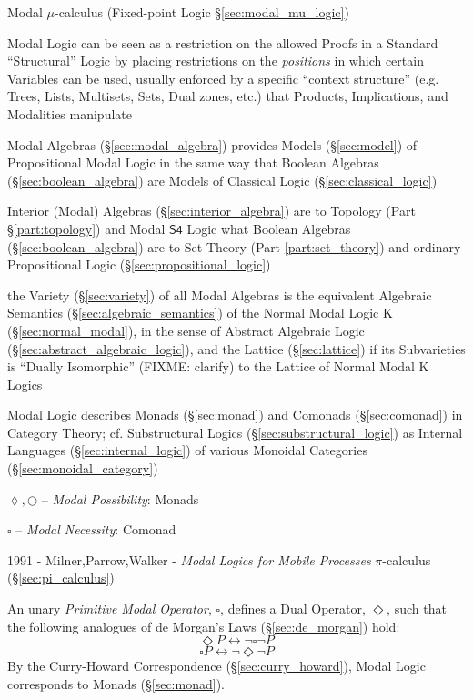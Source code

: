 \fist Modal $\mu$-calculus (Fixed-point Logic \S\ref{sec:modal_mu_logic})

Modal Logic can be seen as a restriction on the allowed Proofs in a
Standard ``Structural'' Logic by placing restrictions on the
\emph{positions} in which certain Variables can be used, usually
enforced by a specific ``context structure'' (e.g. Trees, Lists,
Multisets, Sets, Dual zones, etc.) that Products, Implications, and
Modalities manipulate

Modal Algebras (\S\ref{sec:modal_algebra}) provides Models (\S\ref{sec:model})
of Propositional Modal Logic in the same way that Boolean Algebras
(\S\ref{sec:boolean_algebra}) are Models of Classical Logic
(\S\ref{sec:classical_logic})

Interior (Modal) Algebras (\S\ref{sec:interior_algebra}) are to Topology (Part
\S\ref{part:topology}) and Modal $\mathsf{S4}$ Logic what Boolean Algebras
(\S\ref{sec:boolean_algebra}) are to Set Theory (Part \ref{part:set_theory}) and
ordinary Propositional Logic (\S\ref{sec:propositional_logic})

the Variety (\S\ref{sec:variety}) of all Modal Algebras is the equivalent
Algebraic Semantics (\S\ref{sec:algebraic_semantics}) of the Normal Modal Logic
$\mathrm{K}$ (\S\ref{sec:normal_modal}), in the sense of Abstract Algebraic
Logic (\S\ref{sec:abstract_algebraic_logic}), and the Lattice
(\S\ref{sec:lattice}) if its Subvarieties is ``Dually Isomorphic'' (FIXME:
clarify) to the Lattice of Normal Modal $\mathrm{K}$ Logics

Modal Logic describes Monads (\S\ref{sec:monad}) and Comonads
(\S\ref{sec:comonad}) in Category Theory; cf. Substructural Logics
(\S\ref{sec:substructural_logic}) as Internal Languages
(\S\ref{sec:internal_logic}) of various Monoidal Categories
(\S\ref{sec:monoidal_category})

$\lozenge, \bigcirc$ -- \emph{Modal Possibility}: Monads

$\square$ -- \emph{Modal Necessity}: Comonad

1991 - Milner,Parrow,Walker - \emph{Modal Logics for Mobile Processes} \fist
$\pi$-calculus (\S\ref{sec:pi_calculus})

\asterism

An unary \emph{Primitive Modal Operator}, $\square$, defines a Dual
Operator, $\Diamond$, such that the following analogues of de Morgan's
Laws (\S\ref{sec:de_morgan}) hold:
\[
  \Diamond P \leftrightarrow \neg \square \neg P
\]
\[
  \square P \leftrightarrow \neg \Diamond \neg P
\]
By the Curry-Howard Correspondence (\S\ref{sec:curry_howard}), Modal
Logic corresponds to Monads (\S\ref{sec:monad}).

